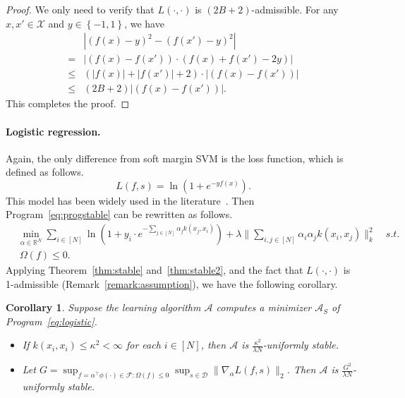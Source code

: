 \documentclass[11pt]{article}
\newtheorem{corollary}[theorem]{Corollary}
\newcommand{\R}{\mathbb{R}}
\newcommand{\calA}{\mathcal{A}}
\newcommand{\calD}{\mathcal{D}}
\newcommand{\calF}{\mathcal{F}}
\newcommand{\calX}{\mathcal{X}}
\begin{document}
	\begin{proof}
		We only need to verify that $L(\cdot,\cdot)$ is $(2B+2)$-admissible.
		For any $x,x'\in \calX$ and $y\in \left\{-1,1\right\}$, we have
		\begin{align*}
		&\left|(f(x)-y)^2-(f(x')-y)^2\right|\\
		=&\left|(f(x)-f(x'))\cdot (f(x)+f(x')-2y)\right| \\
		\leq& (|f(x)|+|f(x')|+2) \cdot\left|(f(x)-f(x'))\right| \\
		\leq& (2B+2)\left|(f(x)-f(x'))\right|.
		\end{align*}
		This completes the proof.
	\end{proof}
	
	
	
	\paragraph{Logistic regression.}
	Again, the only difference from soft margin SVM is the loss function, which is defined as follows.
	\[
	L(f,s) = \ln (1+e^{-y f(x)}).
	\]
	This model has been widely used in the literature~\cite{zafar2017fairness,zafar2017fair,goel2018non}.
	Then Program~\eqref{eq:progstable} can be rewritten as follows.
	\begin{equation} \tag{LR}
	\label{eq:logistic}
	\begin{split}
	& \min_{\alpha\in \R^N} \sum_{i\in [N]} \ln \left(1+y_i\cdot e^{-\sum_{j\in [N]} \alpha_j k(x_j,x_i)}\right) + \lambda \|\sum_{i,j\in [N]}\alpha_i \alpha_j k(x_i,x_j)\|_k^2 \quad s.t. \\
	& ~ \Omega(f)\leq 0.
	\end{split}
	\end{equation}
	Applying Theorem~\ref{thm:stable} and~\ref{thm:stable2}, and the fact that $L(\cdot,\cdot)$ is 1-admissible (Remark~\ref{remark:assumption}), we have the following corollary.
	
	\begin{corollary}
		\label{cor:logisitc}
		Suppose the learning algorithm $\calA$ computes a minimizer $\calA_S$ of Program~\eqref{eq:logistic}.
		\begin{itemize}
			\item If $k(x_i,x_i)\leq \kappa^2<\infty$ for each $i\in [N]$, then $\calA$ is $\frac{\kappa^2}{\lambda N}$-uniformly stable.
			\item Let $G = \sup_{f=\alpha^\top \phi(\cdot)\in \calF: \Omega(f)\leq 0} \sup_{s\in \calD} \|\nabla_\alpha L(f,s)\|_2$.
			Then $\calA$ is $\frac{G^2}{\lambda N}$-uniformly stable.
		\end{itemize} 
	\end{corollary}
	
\end{document}
